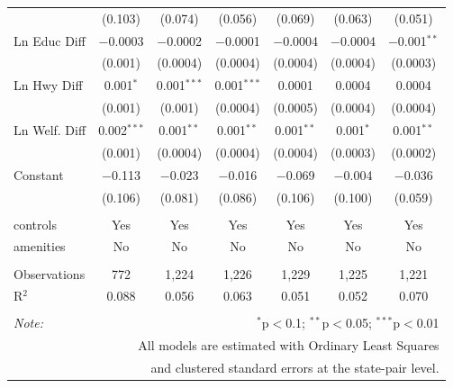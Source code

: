 \begin{table}[!htbp]
\begin{tabular}{@{\extracolsep{5pt}}lcccccc}
  & (0.103) & (0.074) & (0.056) & (0.069) & (0.063) & (0.051) \\ 
  Ln Educ Diff & $-$0.0003 & $-$0.0002 & $-$0.0001 & $-$0.0004 & $-$0.0004 & $-$0.001$^{**}$ \\ 
  & (0.001) & (0.0004) & (0.0004) & (0.0004) & (0.0004) & (0.0003) \\ 
  Ln Hwy Diff & 0.001$^{*}$ & 0.001$^{***}$ & 0.001$^{***}$ & 0.0001 & 0.0004 & 0.0004 \\ 
  & (0.001) & (0.001) & (0.0004) & (0.0005) & (0.0004) & (0.0004) \\ 
  Ln Welf. Diff & 0.002$^{***}$ & 0.001$^{**}$ & 0.001$^{**}$ & 0.001$^{**}$ & 0.001$^{*}$ & 0.001$^{**}$ \\ 
  & (0.001) & (0.0004) & (0.0004) & (0.0004) & (0.0003) & (0.0002) \\ 
  Constant & $-$0.113 & $-$0.023 & $-$0.016 & $-$0.069 & $-$0.004 & $-$0.036 \\ 
  & (0.106) & (0.081) & (0.086) & (0.106) & (0.100) & (0.059) \\ 
 \hline \\[-1.8ex] 
controls & Yes & Yes & Yes & Yes & Yes & Yes \\ 
amenities & No & No & No & No & No & No \\ 
\hline \\[-1.8ex] 
Observations & 772 & 1,224 & 1,226 & 1,229 & 1,225 & 1,221 \\ 
R$^{2}$ & 0.088 & 0.056 & 0.063 & 0.051 & 0.052 & 0.070 \\ 
\hline 
\hline \\[-1.8ex] 
\textit{Note:}  & \multicolumn{6}{r}{$^{*}$p$<$0.1; $^{**}$p$<$0.05; $^{***}$p$<$0.01} \\ 
 & \multicolumn{6}{r}{All models are estimated with Ordinary Least Squares} \\ 
 & \multicolumn{6}{r}{and clustered standard errors at the state-pair level.} \\ 
\end{tabular} 
\end{table} 
